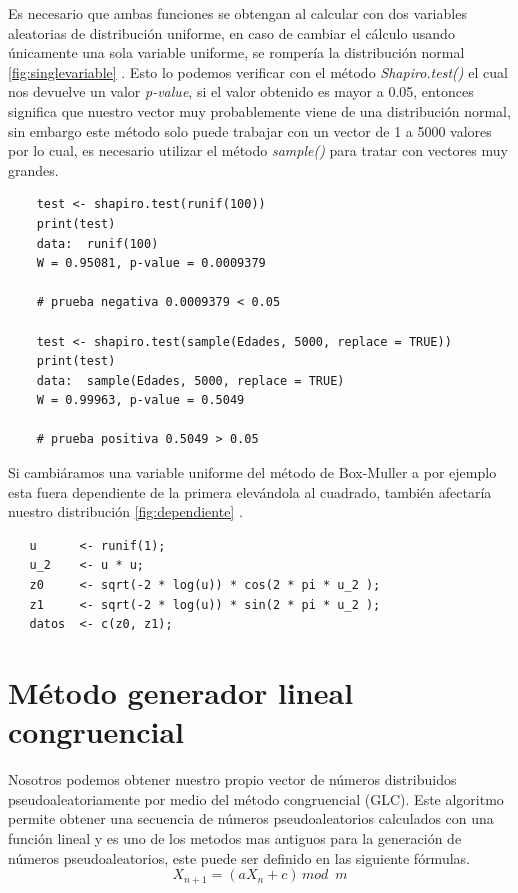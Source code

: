 \documentclass[]{article}
\begin{document}
Es necesario que ambas funciones se obtengan al calcular con dos variables aleatorias de distribución uniforme, en caso de cambiar el cálculo usando únicamente una sola variable uniforme, se rompería la distribución normal  \autoref{fig:singlevariable} .
Esto lo podemos verificar con el método \textit{Shapiro.test()}
el cual nos devuelve un valor \textit{p-value}, si el valor obtenido es mayor a 0.05, entonces significa que nuestro vector muy probablemente viene de una distribución normal, sin embargo este método solo puede trabajar con un vector de 1 a 5000 valores por lo cual, es necesario utilizar el método  \textit{sample()} para tratar con vectores muy grandes.
  \begin{lstlisting}
    test <- shapiro.test(runif(100)) 
    print(test)
    data:  runif(100)
	W = 0.95081, p-value = 0.0009379
	
	# prueba negativa 0.0009379 < 0.05
	                 
    test <- shapiro.test(sample(Edades, 5000, replace = TRUE))
    print(test)
	data:  sample(Edades, 5000, replace = TRUE)
	W = 0.99963, p-value = 0.5049
	
	# prueba positiva 0.5049 > 0.05
   \end{lstlisting}

Si cambiáramos una variable uniforme del método de Box-Muller a por ejemplo esta fuera dependiente de la primera elevándola al cuadrado, también afectaría nuestro distribución \autoref{fig:dependiente} .

  \begin{lstlisting}
   u      <- runif(1);
   u_2    <- u * u;
   z0     <- sqrt(-2 * log(u)) * cos(2 * pi * u_2 );
   z1     <- sqrt(-2 * log(u)) * sin(2 * pi * u_2 );
   datos  <- c(z0, z1);
   \end{lstlisting}

\section{Método generador lineal congruencial}
Nosotros podemos obtener nuestro propio vector de números distribuidos pseudoaleatoriamente por medio del método congruencial (GLC).
Este algoritmo permite obtener una secuencia de números pseudoaleatorios calculados con una función lineal y es uno de los metodos mas antiguos para la generación de números pseudoaleatorios,
este puede ser definido en las siguiente fórmulas.
\[X_{n+1} = (aX_{n} + c) \, mod\, \, \,  m\]
\end{document}
